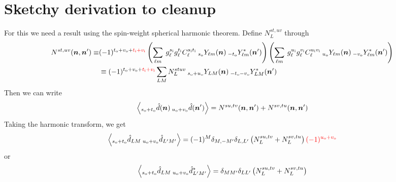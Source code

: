 \documentclass{article}
\newcommand{\si}[0]{{s_{\rm i}}}
\newcommand{\ti}[0]{{t_{\rm i}}}
\newcommand{\ui}[0]{{u_{\rm i}}}
\newcommand{\vi}[0]{{v_{\rm i}}}
\newcommand{\so}[0]{{s_{\rm o}}}
\renewcommand{\to}[0]{{t_{\rm o}}}
\newcommand{\uo}[0]{{u_{\rm o}}}
\newcommand{\vo}[0]{{v_{\rm o}}}
\newcommand{\Ylm}[1]{\:_{#1}Y_{\ell m}}
\newcommand{\Ylms}[1]{\:_{#1}Y^*_{\ell m}}
\newcommand{\YLM}[1]{\:_{#1}Y_{L M}}
\newcommand{\YLMs}[1]{\:_{#1}Y^*_{L M}}
\newcommand{\av}[1]{\left\langle #1 \right\rangle}
\newcommand{\red}[1]{\color{red}#1 \color{black} }
\newcommand{\hn}[0]{\boldsymbol{n}}
\begin{document}
\section{Sketchy derivation to cleanup}
For this we need a result using the spin-weight spherical harmonic theorem.
Define $N^{st,uv}_L $ through
\begin{equation}
\begin{split}
N^{st,uv}(\hn, \hn') \equiv	& (-1)^{\to + \vo + \red{\ti + \vi} }\left(\sum_{\ell m}\: g^{\si}_\ell g^{\ti}_\ell C_\ell^{\si \ti} \Ylm \so(\hn)   \Ylms {-\to}  (\hn')\right) \left(\sum_{\ell m}\: g^{\ui}_\ell g^{\vi}_\ell C_\ell^{\ui \vi} \Ylm \uo(\hn)   \Ylms {-\vo} (\hn')\right) \\ &\equiv (-1)^{\to + \vo + \red{\ti + \vi}} \sum_{LM} N^{stuv}_L  \YLM{\so + \uo}(\hn)   \YLMs {-\to - \vo} (\hn')
\end{split}
\end{equation}
Then we can write
\begin{equation}
\begin{split}
	\av{ _{\so + \to}\hat d(\hn)\: _{\uo + \vo}\hat d(\hn')} =N^{su,tv}(\hn, \hn') + N^{sv,tu}(\hn, \hn')
\end{split}
\end{equation}
Taking the harmonic transform, we get
\begin{equation}
	\av{ _{\so + \to}\hat d_{LM} \:_{\uo + \vo}\hat d_{L'M'}} = (-1)^M\delta_{M, -M'}\delta_{L,L'}\left(N^{su, tv}_L + N^{sv, tu}_L\right)\red{(-1)^{\uo + \vo}}
\end{equation}
\red{or
\begin{equation}
	\av{ _{\so + \to}\hat d_{LM} \:_{\uo + \vo}\hat d^*_{L'M'}} = \delta_{MM'}\delta_{LL'}\left(N^{su, tv}_L + N^{sv, tu}_L\right)
\end{equation}}
\end{document}
